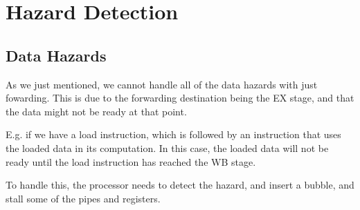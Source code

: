 \documentclass{beamer}
\begin{document}
\section{Hazard Detection}
\subsection{Data Hazards}
\begin{frame}
    As we just mentioned, we cannot handle all of the data hazards with just
    fowarding. This is due to the forwarding destination being the EX stage,
    and that the data might not be ready at that point.

    \vspace{\baselineskip}
    E.g. if we have a load instruction, which is followed by an instruction
    that uses the loaded data in its computation. In this case, the loaded data
    will not be ready until the load instruction has reached the WB stage.

    \vspace{\baselineskip}
    To handle this, the processor needs to detect the hazard, and insert a
    bubble, and stall some of the pipes and registers.
\end{frame}
\end{document}
